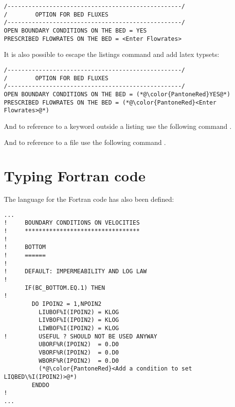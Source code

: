 \lstset{language=TelemacCas,
        basicstyle=\scriptsize\ttfamily}

\begin{lstlisting}[frame=trBL]
/--------------------------------------------------/
/        OPTION FOR BED FLUXES
/--------------------------------------------------/
OPEN BOUNDARY CONDITIONS ON THE BED = YES
PRESCRIBED FLOWRATES ON THE BED = <Enter Flowrates>
\end{lstlisting}

It is also possible to escape the listings command and add latex typsets:

\begin{lstlisting}[frame=trBL]
/--------------------------------------------------/
/        OPTION FOR BED FLUXES
/--------------------------------------------------/
OPEN BOUNDARY CONDITIONS ON THE BED = (*@\color{PantoneRed}YES@*)
PRESCRIBED FLOWRATES ON THE BED = (*@\color{PantoneRed}<Enter Flowrates>@*)
\end{lstlisting}


And to reference to a keyword outside a listing use the following command
.

And to reference to a file use the following command .

\section{Typing Fortran code}

The language for the Fortran code has also been defined:

\lstset{language=Fortran,
        basicstyle=\scriptsize\ttfamily}

\begin{lstlisting}[frame=trBL]
...
!     BOUNDARY CONDITIONS ON VELOCITIES
!     *********************************
!
!     BOTTOM
!     ======
!
!     DEFAULT: IMPERMEABILITY AND LOG LAW
!
      IF(BC_BOTTOM.EQ.1) THEN
!
        DO IPOIN2 = 1,NPOIN2
          LIUBOF%I(IPOIN2) = KLOG
          LIVBOF%I(IPOIN2) = KLOG
          LIWBOF%I(IPOIN2) = KLOG
!         USEFUL ? SHOULD NOT BE USED ANYWAY
          UBORF%R(IPOIN2)  = 0.D0
          VBORF%R(IPOIN2)  = 0.D0
          WBORF%R(IPOIN2)  = 0.D0
          (*@\color{PantoneRed}<Add a condition to set LIQBED\%I(IPOIN2)>@*)
        ENDDO
!
...
\end{lstlisting}

